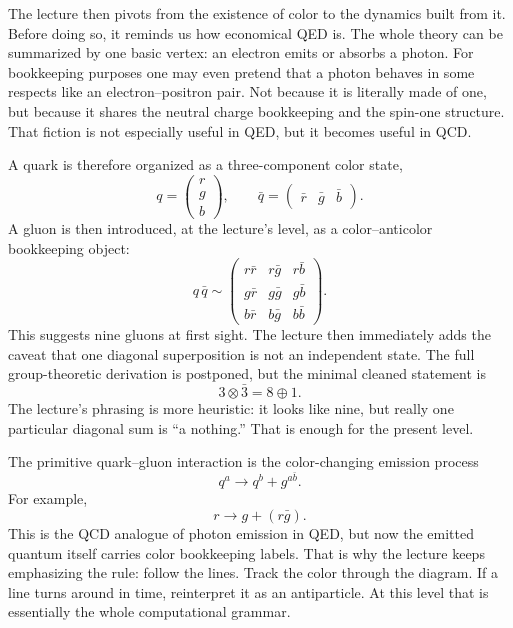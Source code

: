 The lecture then pivots from the existence of color to the dynamics built from it. Before doing so, it reminds us how economical QED is. The whole theory can be summarized by one basic vertex: an electron emits or absorbs a photon. For bookkeeping purposes one may even pretend that a photon behaves in some respects like an electron--positron pair. Not because it is literally made of one, but because it shares the neutral charge bookkeeping and the spin-one structure. That fiction is not especially useful in QED, but it becomes useful in QCD.

A quark is therefore organized as a three-component color state,
\begin{equation}
q=
\begin{pmatrix}
r\\
g\\
b
\end{pmatrix},
\qquad
\bar q=
\begin{pmatrix}
\bar r & \bar g & \bar b
\end{pmatrix}.
\end{equation}
A gluon is then introduced, at the lecture's level, as a color--anticolor bookkeeping object:
\begin{equation}
q\,\bar q \sim
\begin{pmatrix}
r\bar r & r\bar g & r\bar b\\
g\bar r & g\bar g & g\bar b\\
b\bar r & b\bar g & b\bar b
\end{pmatrix}.
\end{equation}
This suggests nine gluons at first sight. The lecture then immediately adds the caveat that one diagonal superposition is not an independent state. The full group-theoretic derivation is postponed, but the minimal cleaned statement is
\begin{equation}
3\otimes \bar 3 = 8\oplus 1.
\end{equation}
The lecture's phrasing is more heuristic: it looks like nine, but really one particular diagonal sum is ``a nothing.'' That is enough for the present level.

The primitive quark--gluon interaction is the color-changing emission process
\begin{equation}
q^a \longrightarrow q^b + g^{a\bar b}.
\end{equation}
For example,
\begin{equation}
r \longrightarrow g + (r\bar g).
\end{equation}
This is the QCD analogue of photon emission in QED, but now the emitted quantum itself carries color bookkeeping labels. That is why the lecture keeps emphasizing the rule: follow the lines. Track the color through the diagram. If a line turns around in time, reinterpret it as an antiparticle. At this level that is essentially the whole computational grammar.

